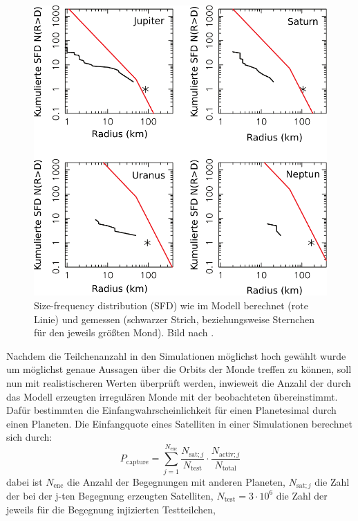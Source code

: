 \documentclass[12pt,a4paper,twoside,open=right,bibliography=totoc]{scrbook}
\renewcommand{\cite}{ \citep}
\begin{document}
\begin{figure}[tbn]
\centering
\includegraphics[scale=.5]{img/Nesvorny2007-9}
\caption{Size-frequency distribution (SFD) wie im Modell berechnet (rote Linie) und gemessen (schwarzer Strich, beziehungsweise Sternchen für den jeweils größten Mond). Bild nach \cite{Nesvorny2007}.}
\label{fig:SFD}
\end{figure}
Nachdem die Teilchenanzahl in den Simulationen möglichst hoch gewählt wurde um möglichst genaue Aussagen über die Orbits der Monde treffen zu können, 
soll nun mit realistischeren Werten überprüft werden, inwieweit die Anzahl der durch das Modell erzeugten irregulären Monde mit der beobachteten übereinstimmt.
Dafür bestimmten \cite{Nesvorny2007} die Einfangwahrscheinlichkeit für einen Planetesimal durch einen Planeten.
Die Einfangquote eines Satelliten in einer Simulationen berechnet sich durch:
\begin{equation}
P_{\text{capture}} = \sum\limits^{N_{\text{enc}}}_{j=1} \frac{N_{\text{sat}; j}}{N_{\text{test}}}\cdot \frac{N_{\text{activ}; j}}{N_{\text{total}}}
\end{equation} %
dabei ist $N_{\text{enc}}$ die Anzahl der Begegnungen mit anderen Planeten, $N_{\text{sat};j}$ die Zahl der bei der j-ten Begegnung erzeugten Satelliten, $N_{\text{test}} = 3 \cdot 10^6$ die Zahl der jeweils für die Begegnung injizierten Testteilchen, 
\end{document}
